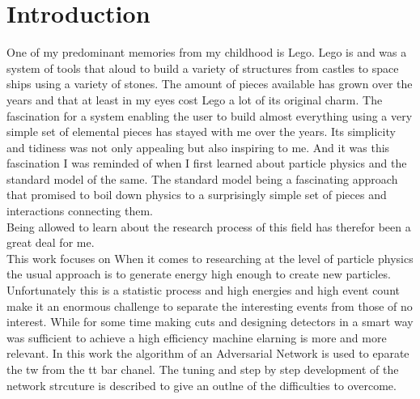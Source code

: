 

\chapter{Introduction}
\label{sec:intro}
One of my predominant memories from my childhood is Lego. Lego is and was a system of tools that aloud to build a variety of structures from castles to space ships using a variety of stones. The amount of pieces available has grown over the years and that at least in my eyes cost Lego a lot of its original charm. The fascination for a system enabling the user to build almost everything using a very simple set of elemental pieces has stayed with me over the years. Its simplicity and tidiness was not only appealing but also inspiring to me. 
And it was this fascination I was reminded of when I first learned about particle physics and the standard model of the same. The standard model being a fascinating approach that promised to boil down physics to a surprisingly simple set of pieces and interactions connecting them.\\
Being allowed to learn about the research process of this field has therefor been a great deal for me.\\
This work focuses on 
When it comes to researching at the level of particle physics the usual approach is to generate energy high enough to create new particles. Unfortunately this is a statistic process and high energies and high event count make it an enormous challenge to separate the interesting events from those of no interest. While for some time making cuts and designing detectors in a smart way was sufficient to achieve a high efficiency machine elarning is more and more relevant.
In this work the algorithm of an Adversarial Network is used to eparate the tw from the tt bar chanel. The tuning and step by step development of the network strcuture is described to give an outlne of the difficulties to overcome.
